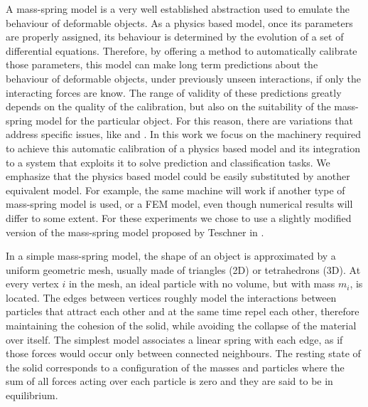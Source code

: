 \documentclass[journal]{IEEEtran}
\newcommand{\sref}[1]{Section~\ref{#1}}
\newcommand{\comment}[1]{{\color{red} #1}}
\begin{document}
\comment{
A mass-spring model is a very well established abstraction used to emulate the behaviour of deformable objects.  As a physics based model, once its parameters are properly assigned, its behaviour is determined by the evolution of a set of differential equations.  Therefore, by offering a method to automatically calibrate those parameters, this model can make long term predictions about the behaviour of deformable objects, under previously unseen interactions, if only the interacting forces are know.  The range of validity of these predictions greatly depends on the quality of the calibration, but also on the suitability of the mass-spring model for the particular object.  For this reason, there are variations that address specific issues, like \cite{Bourguignon2000} and \cite{Teschner2004}.  In this work we focus on the machinery required to achieve this automatic calibration of a physics based model and its integration to a system that exploits it to solve prediction and classification tasks.  We emphasize that the physics based model could be easily substituted by another equivalent model.  For example, the same machine will work if another type of mass-spring model is used, or a FEM model, even though numerical results will differ to some extent.  For these experiments we chose to use a slightly modified version of the mass-spring model proposed by Teschner in \cite{Teschner2004}.


In a simple mass-spring model, the shape of an object is approximated by a uniform geometric mesh, usually made of triangles (2D) or tetrahedrons (3D).  At every vertex $i$ in the mesh, an ideal particle with no volume, but with mass $m_i$, is located.  The edges between vertices roughly model the interactions between particles that attract each other and at the same time repel each other, therefore maintaining the cohesion of the solid, while avoiding the collapse of the material over itself.  The simplest model associates a linear spring with each edge, as if those forces would occur only between connected neighbours.  The resting state of the solid corresponds to a configuration of the masses and particles where the sum of all forces acting over each particle is zero and they are said to be in equilibrium.

}
\end{document}
